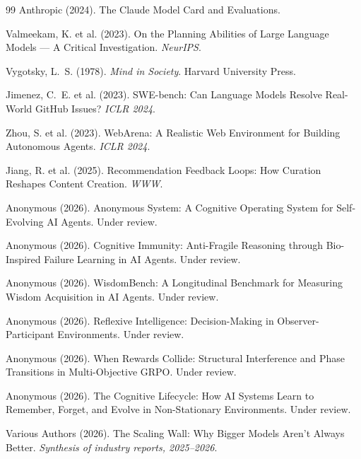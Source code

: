 \documentclass{article}
\begin{document}
\begin{thebibliography}{99}
Anthropic (2024).
The Claude Model Card and Evaluations.

Valmeekam, K. et al. (2023).
On the Planning Abilities of Large Language Models --- A Critical
Investigation.
\textit{NeurIPS}.

Vygotsky, L.~S. (1978).
\textit{Mind in Society}. Harvard University Press.

Jimenez, C.~E. et al. (2023).
SWE-bench: Can Language Models Resolve Real-World GitHub Issues?
\textit{ICLR 2024}.

Zhou, S. et al. (2023).
WebArena: A Realistic Web Environment for Building Autonomous Agents.
\textit{ICLR 2024}.

Jiang, R. et al. (2025).
Recommendation Feedback Loops: How Curation Reshapes Content Creation.
\textit{WWW}.

Anonymous (2026).
Anonymous System: A Cognitive Operating System for Self-Evolving AI Agents.
Under review.

Anonymous (2026).
Cognitive Immunity: Anti-Fragile Reasoning through Bio-Inspired
Failure Learning in AI Agents.
Under review.

Anonymous (2026).
WisdomBench: A Longitudinal Benchmark for Measuring Wisdom
Acquisition in AI Agents.
Under review.

Anonymous (2026).
Reflexive Intelligence: Decision-Making in Observer-Participant
Environments.
Under review.

Anonymous (2026).
When Rewards Collide: Structural Interference and Phase Transitions in
Multi-Objective GRPO.
Under review.

Anonymous (2026).
The Cognitive Lifecycle: How AI Systems Learn to Remember, Forget, and
Evolve in Non-Stationary Environments.
Under review.

Various Authors (2026).
The Scaling Wall: Why Bigger Models Aren't Always Better.
\textit{Synthesis of industry reports, 2025--2026}.


\end{thebibliography}
\end{document}
